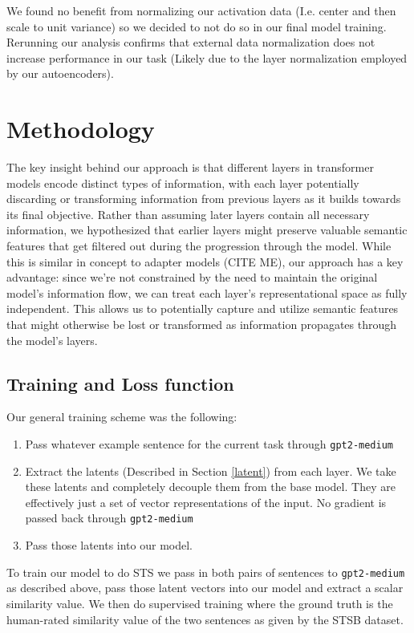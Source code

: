 \documentclass{article}
\begin{document}
We found no benefit from normalizing our activation data (I.e. center and then scale to unit variance) so we decided to not do so in our final model training. Rerunning our analysis confirms that external data normalization does not increase performance in our task (Likely due to the layer normalization employed by our autoencoders).


\section{Methodology}
The key insight behind our approach is that different layers in transformer models encode distinct types of information, with each layer potentially discarding or transforming information from previous layers as it builds towards its final objective. Rather than assuming later layers contain all necessary information, we hypothesized that earlier layers might preserve valuable semantic features that get filtered out during the progression through the model. While this is similar in concept to adapter models (CITE ME), our approach has a key advantage: since we're not constrained by the need to maintain the original model's information flow, we can treat each layer's representational space as fully independent. This allows us to potentially capture and utilize semantic features that might otherwise be lost or transformed as information propagates through the model's layers.

\subsection{Training and Loss function} \label{Loss} \label{Training}
Our general training scheme was the following:
\begin{enumerate}
    \item Pass whatever example sentence for the current task through \verb|gpt2-medium|
    \item Extract the latents (Described in Section \ref{latent}) from each layer. We take these latents and completely decouple them from the base model. They are effectively just a set of vector representations of the input. No gradient is passed back through \verb|gpt2-medium|
    \item Pass those latents into our model.
\end{enumerate}
To train our model to do STS we pass in both pairs of sentences to \verb|gpt2-medium| as described above, pass those latent vectors into our model and extract a scalar similarity value. We then do supervised training where the ground truth is the human-rated similarity value of the two sentences as given by the STSB dataset.
\end{document}
